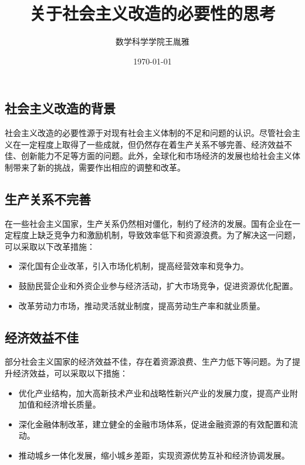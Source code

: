 \documentclass{article}
\begin{document}
\small
\begin{CJK*}{UTF8}{gbsn}

  \title{关于社会主义改造的必要性的思考}

  \author{数学科学学院\quad 王胤雅}

  \date{\today}

  \maketitle

  \section{社会主义改造的背景}
  社会主义改造的必要性源于对现有社会主义体制的不足和问题的认识。尽管社会主义在一定程度上取得了一些成就，但仍然存在着生产关系不够完善、经济效益不佳、创新能力不足等方面的问题。此外，全球化和市场经济的发展也给社会主义体制带来了新的挑战，需要作出相应的调整和改革。

  \subsection{生产关系不完善}
  在一些社会主义国家，生产关系仍然相对僵化，制约了经济的发展。国有企业在一定程度上缺乏竞争力和激励机制，导致效率低下和资源浪费。为了解决这一问题，可以采取以下改革措施：
  \begin{itemize}
    \item 深化国有企业改革，引入市场化机制，提高经营效率和竞争力。
    \item 鼓励民营企业和外资企业参与经济活动，扩大市场竞争，促进资源优化配置。
    \item 改革劳动力市场，推动灵活就业制度，提高劳动生产率和就业质量。
  \end{itemize}

  \subsection{经济效益不佳}
  部分社会主义国家的经济效益不佳，存在着资源浪费、生产力低下等问题。为了提升经济效益，可以采取以下措施：
  \begin{itemize}
    \item 优化产业结构，加大高新技术产业和战略性新兴产业的发展力度，提高产业附加值和经济增长质量。
    \item 深化金融体制改革，建立健全的金融市场体系，促进金融资源的有效配置和流动。
    \item 推动城乡一体化发展，缩小城乡差距，实现资源优势互补和经济协调发展。
  \end{itemize}


\end{CJK*}
\end{document}
